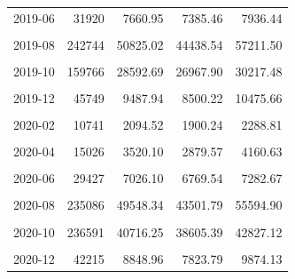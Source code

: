 \begin{longtable}[t]{crrrr}
2019-06 & 31920 & 7660.95 & 7385.46 & 7936.44\\
\cellcolor{gray!10}{2019-07} & \cellcolor{gray!10}{63582} & \cellcolor{gray!10}{14876.41} & \cellcolor{gray!10}{12511.17} & \cellcolor{gray!10}{17241.65}\\
2019-08 & 242744 & 50825.02 & 44438.54 & 57211.50\\
\cellcolor{gray!10}{2019-09} & \cellcolor{gray!10}{282749} & \cellcolor{gray!10}{56084.52} & \cellcolor{gray!10}{53197.38} & \cellcolor{gray!10}{58971.67}\\
2019-10 & 159766 & 28592.69 & 26967.90 & 30217.48\\
\cellcolor{gray!10}{2019-11} & \cellcolor{gray!10}{106142} & \cellcolor{gray!10}{21077.30} & \cellcolor{gray!10}{19007.88} & \cellcolor{gray!10}{23146.73}\\
2019-12 & 45749 & 9487.94 & 8500.22 & 10475.66\\
\cellcolor{gray!10}{2020-01} & \cellcolor{gray!10}{15885} & \cellcolor{gray!10}{3063.91} & \cellcolor{gray!10}{2664.19} & \cellcolor{gray!10}{3463.63}\\
2020-02 & 10741 & 2094.52 & 1900.24 & 2288.81\\
\cellcolor{gray!10}{2020-03} & \cellcolor{gray!10}{15543} & \cellcolor{gray!10}{3816.65} & \cellcolor{gray!10}{3408.89} & \cellcolor{gray!10}{4224.41}\\
2020-04 & 15026 & 3520.10 & 2879.57 & 4160.63\\
\cellcolor{gray!10}{2020-05} & \cellcolor{gray!10}{16534} & \cellcolor{gray!10}{4094.31} & \cellcolor{gray!10}{3803.38} & \cellcolor{gray!10}{4385.23}\\
2020-06 & 29427 & 7026.10 & 6769.54 & 7282.67\\
\cellcolor{gray!10}{2020-07} & \cellcolor{gray!10}{71211} & \cellcolor{gray!10}{15716.60} & \cellcolor{gray!10}{12767.80} & \cellcolor{gray!10}{18665.41}\\
2020-08 & 235086 & 49548.34 & 43501.79 & 55594.90\\
\cellcolor{gray!10}{2020-09} & \cellcolor{gray!10}{371618} & \cellcolor{gray!10}{74535.08} & \cellcolor{gray!10}{69475.16} & \cellcolor{gray!10}{79595.01}\\
2020-10 & 236591 & 40716.25 & 38605.39 & 42827.12\\
\cellcolor{gray!10}{2020-11} & \cellcolor{gray!10}{75367} & \cellcolor{gray!10}{16551.62} & \cellcolor{gray!10}{14622.74} & \cellcolor{gray!10}{18480.50}\\
2020-12 & 42215 & 8848.96 & 7823.79 & 9874.13\\

\end{longtable}
